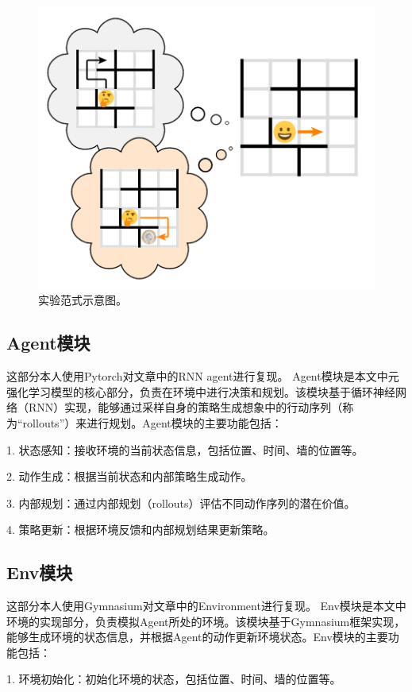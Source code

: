 \documentclass[UTF8,12pt]{article} %
\begin{document}
\begin{figure}[H]
	\center
	\includegraphics[scale=0.6]{figs/fanshi.png}
	\centering
	\caption{实验范式示意图。}\label{fig:fanshi}
\end{figure}

\subsection{Agent模块}
	这部分本人使用Pytorch对文章中的RNN agent进行复现。
	Agent模块是本文中元强化学习模型的核心部分，负责在环境中进行决策和规划。该模块基于循环神经网络（RNN）实现，能够通过采样自身的策略生成想象中的行动序列（称为“rollouts”）来进行规划。Agent模块的主要功能包括：

	1. 状态感知：接收环境的当前状态信息，包括位置、时间、墙的位置等。

	2. 动作生成：根据当前状态和内部策略生成动作。

	3. 内部规划：通过内部规划（rollouts）评估不同动作序列的潜在价值。

	4. 策略更新：根据环境反馈和内部规划结果更新策略。

\subsection{Env模块}
	这部分本人使用Gymnasium对文章中的Environment进行复现。
	Env模块是本文中环境的实现部分，负责模拟Agent所处的环境。该模块基于Gymnasium框架实现，能够生成环境的状态信息，并根据Agent的动作更新环境状态。Env模块的主要功能包括：
	
	1. 环境初始化：初始化环境的状态，包括位置、时间、墙的位置等。
	
\end{document}
